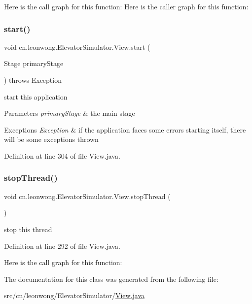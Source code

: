Here is the call graph for this function\+:
Here is the caller graph for this function\+:
\mbox{\label{classcn_1_1leonwong_1_1_elevator_simulator_1_1_view_a068904406a0d25168fedd721dee528ac}} 
\subsubsection{\texorpdfstring{start()}{start()}}
{\footnotesize\ttfamily void cn.\+leonwong.\+Elevator\+Simulator.\+View.\+start (\begin{DoxyParamCaption}\item[{Stage}]{primary\+Stage }\end{DoxyParamCaption}) throws Exception}

start this application 
\begin{DoxyParams}{Parameters}
{\em primary\+Stage} & the main stage \\
\hline
\end{DoxyParams}

\begin{DoxyExceptions}{Exceptions}
{\em Exception} & if the application faces some errors starting itself, there will be some exceptions thrown \\
\hline
\end{DoxyExceptions}


Definition at line 304 of file View.\+java.

\mbox{\label{classcn_1_1leonwong_1_1_elevator_simulator_1_1_view_a0cea78020cab972bf8370aff8bed9eea}} 
\subsubsection{\texorpdfstring{stop\+Thread()}{stopThread()}}
{\footnotesize\ttfamily void cn.\+leonwong.\+Elevator\+Simulator.\+View.\+stop\+Thread (\begin{DoxyParamCaption}{ }\end{DoxyParamCaption})}

stop this thread 

Definition at line 292 of file View.\+java.

Here is the call graph for this function\+:


The documentation for this class was generated from the following file\+:\begin{DoxyCompactItemize}
\item 
src/cn/leonwong/\+Elevator\+Simulator/\hyperlink{_view_8java}{View.\+java}\end{DoxyCompactItemize}
